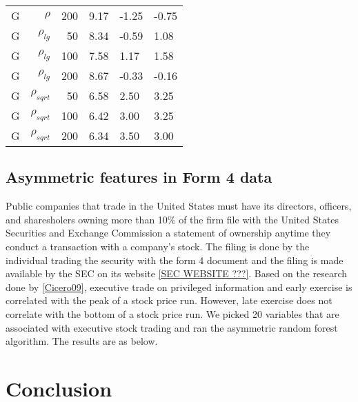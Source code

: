 \documentclass[twoside,11pt]{article}
\begin{document}
\begin{table}
\begin{tabular}{rrrp{2.5cm}p{2.5cm}p{2.5cm}}
G     & $\rho$ & 200   & 9.17  & -1.25 & -0.75 \\
G     & $\rho_{lg}$ & 50    & 8.34  & -0.59 & 1.08 \\
G     & $\rho_{lg}$ & 100   & 7.58  & 1.17  & 1.58 \\
G     & $\rho_{lg}$ & 200   & 8.67  & -0.33 & -0.16 \\
G     & $\rho_{sqrt}$ & 50    & 6.58  & 2.50  & 3.25 \\
G     & $\rho_{sqrt}$ & 100   & 6.42  & 3.00  & 3.25 \\
G     & $\rho_{sqrt}$ & 200   & 6.34  & 3.50  & 3.00 \bigstrut[b]\\
\hline
\end{tabular}%
\label{tab:asymmetricfeaturesresults2}%
\end{table}%


\subsection{Asymmetric features in Form 4 data}
Public companies that trade in the United States must have its directors, officers, and sharesholers owning more than 10\% of the firm file with the United States Securities and Exchange Commission a statement of ownership anytime they conduct a transaction with a company's stock. The filing is done by the individual trading the security with the form 4 document and the filing is made available by the SEC on its website \ref{SEC WEBSITE ???}. Based on the research done by \ref{Cicero09}, executive trade on privileged information and early exercise is correlated with the peak of a stock price run. However, late exercise does not correlate with the bottom of a stock price run. We picked 20 variables that are associated with executive stock trading and ran the asymmetric random forest algorithm. The results are as below.  



\section{Conclusion}



\end{document}
